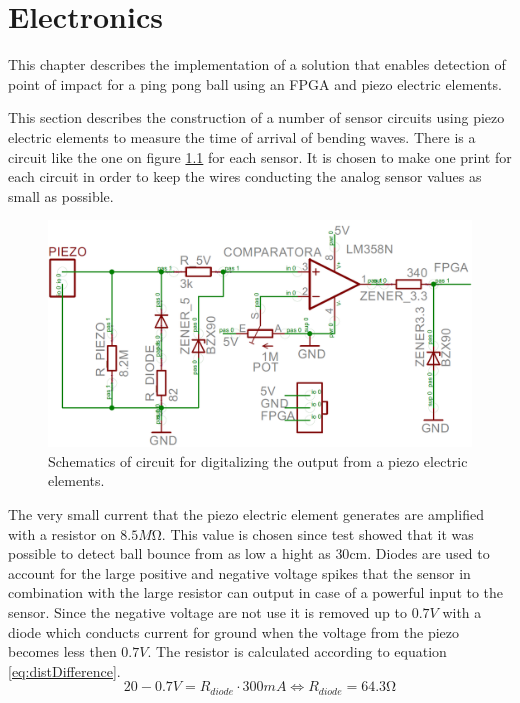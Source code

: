 \chapter{Electronics} %
\label{chap:electronics}

This chapter describes the implementation of a solution that enables detection of point of impact for a ping pong ball using an FPGA and piezo electric elements.

This section describes the construction of a number of sensor circuits using piezo electric elements to measure the time of arrival of bending waves.
There is a circuit like the one on figure \ref{fig:print} for each sensor. It is chosen to make one print for each circuit in order to keep the wires conducting the analog sensor values as small as possible. 
\begin{figure}[htb]
	\centering
	\includegraphics[width=1.\textwidth]{figures/Print}
	\caption{Schematics of circuit for digitalizing the output from a piezo electric elements.}
	\label{fig:print}
\end{figure}
The very small current that the piezo electric element generates are amplified with a resistor on $8.5M\si{\ohm}$. This value is chosen since test showed that it was possible to detect ball bounce from as low a hight as $30\si{\centi\meter}$.
Diodes are used to account for the large positive and negative voltage spikes that the sensor in combination with the large resistor can output in case of a powerful input to the sensor. 
Since the negative voltage are not use it is removed up to $0.7V$ with a diode which conducts current for ground when the voltage from the piezo becomes less then $0.7V$.
The resistor is calculated according to equation \ref{eq:distDifference}.
\begin{equation}
 20 - 0.7 V = R_{diode} \cdot 300mA \Leftrightarrow R_{diode} = 64.3\si{\ohm}
 \label{diodeResistor}
\end{equation}
